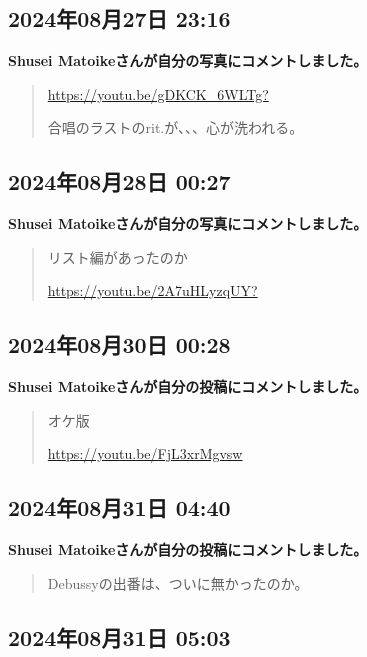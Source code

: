 \subsection*{2024年08月27日 23:16}

\textbf{Shusei Matoikeさんが自分の写真にコメントしました。}

\begin{quote}
\url{https://youtu.be/gDKCK_6WLTg?}

合唱のラストのrit.が、、、心が洗われる。
\end{quote}

\subsection*{2024年08月28日 00:27}

\textbf{Shusei Matoikeさんが自分の写真にコメントしました。}

\begin{quote}
リスト編があったのか

\url{https://youtu.be/2A7uHLyzqUY?}
\end{quote}

\subsection*{2024年08月30日 00:28}

\textbf{Shusei Matoikeさんが自分の投稿にコメントしました。}

\begin{quote}
オケ版

\url{https://youtu.be/FjL3xrMgvsw}
\end{quote}

\subsection*{2024年08月31日 04:40}

\textbf{Shusei Matoikeさんが自分の投稿にコメントしました。}

\begin{quote}
Debussyの出番は、ついに無かったのか。
\end{quote}

\subsection*{2024年08月31日 05:03}

